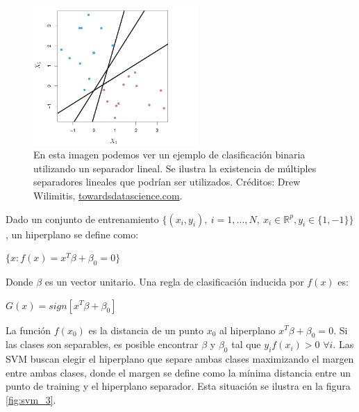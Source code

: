 \begin{figure}[h!]
\begin{center}
  \includegraphics[width=0.56\textwidth]{Kap1/svm1.png} 
\end{center}
\caption{ En esta imagen podemos ver un ejemplo de clasificación binaria utilizando un separador lineal. Se ilustra la existencia de múltiples separadores lineales que podrían ser utilizados. Créditos: Drew Wilimitis, \url{towardsdatascience.com}.}
\label{fig:sv1}
\end{figure}

Dado un conjunto de entrenamiento $\{ (x_i,y_i), \ i=1,\ldots,N, \ x_i \in \mathds{R}^p , y_i \in \{1,-1\} \}$, un hiperplano se define como:

\begin{center}
$\{ x : f(x) =  x^T\beta + \beta_0 = 0 \}$
\end{center}

Donde $\beta$ es un vector unitario. Una regla de clasificación inducida por $f(x)$ es:

\begin{center}
$G(x) = sign[x^T\beta + \beta_0]$
\end{center}

La función $f(x_0)$ es la distancia de un punto $x_0$ al hiperplano $x^T\beta + \beta_0 = 0$. Si las clases son separables, es posible encontrar $\beta$ y $\beta_0$ tal que $y_i f(x_i) > 0$ $\forall i$. Las SVM buscan elegir el hiperplano que separe ambas clases maximizando el margen entre ambas clases, donde el margen se define como la mínima distancia entre un punto de training y el hiperplano separador. Esta situación se ilustra en la figura \ref{fig:svm_3}. \\

